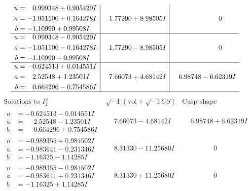 \documentclass[1p]{elsarticle_modified}
\theoremstyle{definition}
\newcommand{\I}{\sqrt{-1}}
\begin{document}
$$\begin{array}{c|c|c}
\begin{aligned}
u &= \phantom{-}0.999348 + 0.905429 I \\
a &= -1.051100 + 0.164278 I \\
b &= -1.10990 + 0.99508 I\end{aligned}
 & \phantom{-}1.77290 + 8.98505 I & \phantom{-0.000000 } 0 \\ \hline\begin{aligned}
u &= \phantom{-}0.999348 - 0.905429 I \\
a &= -1.051100 - 0.164278 I \\
b &= -1.10990 - 0.99508 I\end{aligned}
 & \phantom{-}1.77290 - 8.98505 I & \phantom{-0.000000 } 0 \\ \hline\begin{aligned}
u &= -0.624513 + 0.014551 I \\
a &= \phantom{-}2.52548 + 1.23501 I \\
b &= \phantom{-}0.664296 - 0.754586 I\end{aligned}
 & \phantom{-}7.66073 + 4.68142 I & \phantom{-}6.98748 - 6.62319 I\\
 \hline 
 \end{array}$$\newpage$$\begin{array}{c|c|c}  
\text{Solutions to }I^u_{2}& \I (\text{vol} + \sqrt{-1}CS) & \text{Cusp shape}\\
 \hline 
\begin{aligned}
u &= -0.624513 - 0.014551 I \\
a &= \phantom{-}2.52548 - 1.23501 I \\
b &= \phantom{-}0.664296 + 0.754586 I\end{aligned}
 & \phantom{-}7.66073 - 4.68142 I & \phantom{-}6.98748 + 6.62319 I \\ \hline\begin{aligned}
u &= -0.989355 + 0.981502 I \\
a &= -0.983641 - 0.231346 I \\
b &= -1.16325 - 1.14285 I\end{aligned}
 & \phantom{-}8.31330 - 11.25680 I & \phantom{-0.000000 } 0 \\ \hline\begin{aligned}
u &= -0.989355 - 0.981502 I \\
a &= -0.983641 + 0.231346 I \\
b &= -1.16325 + 1.14285 I\end{aligned}
 & \phantom{-}8.31330 + 11.25680 I & \phantom{-0.000000 } 0 \\ \hline\begin{aligned}

\end{aligned}
\end{array}$$
\end{document}

